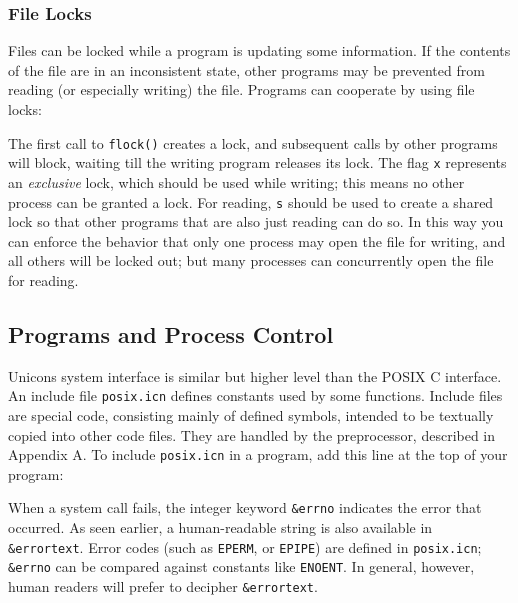 \subsubsection{File Locks}

Files can be locked while a program is
updating some information. If the contents of the file are in an
inconsistent state, other programs may be prevented from reading (or
especially writing) the file. Programs can cooperate by using file
locks:


\noindent
The first call to \texttt{flock()} creates a lock, and subsequent
calls by other programs will block, waiting till the
writing program releases its lock. The flag
\texttt{{\textquotedbl}x{\textquotedbl}} represents an
\textit{exclusive} lock, which should be used while writing; this means
no other process can be granted a lock. For reading,
\texttt{{\textquotedbl}s{\textquotedbl}} should be used to create a
shared lock so that other programs that are also just reading can do
so. In this way you can enforce the behavior that only one process may
open the file for writing, and all others will be locked out; but many
processes can concurrently open the file for reading.

\subsection{Programs and Process Control}

Unicon{\textquotesingle}s system interface is similar but
higher level than the POSIX C interface. An include file
\texttt{posix.icn} defines constants used by some functions. Include
files are special code, consisting mainly of defined symbols, intended
to be textually copied into other code files. They are handled by the
preprocessor, described in Appendix A. To include \texttt{posix.icn} in
a program, add this line at the top of your program:


When a system call fails, the integer keyword
\texttt{\&errno} indicates the error that occurred. As seen earlier, a
human-readable string is also available in \texttt{\&errortext}. Error codes (such as \texttt{EPERM}, or
\texttt{EPIPE}) are defined in \texttt{posix.icn}; \texttt{\&errno} can be compared against constants like
\texttt{ENOENT}. In general, however, human readers will prefer to
decipher \texttt{\&errortext}.

